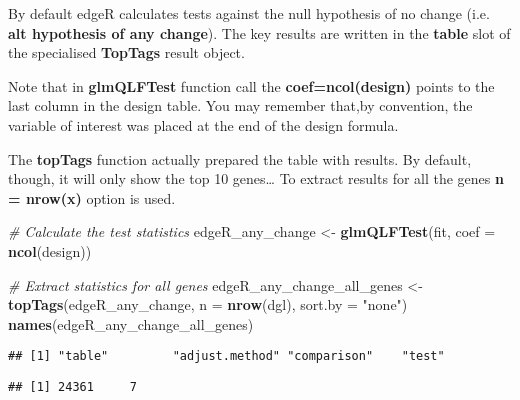 \documentclass[]{book}
\newenvironment{Shaded}{\begin{snugshade}}{\end{snugshade}}
\newcommand{\KeywordTok}[1]{\textcolor[rgb]{0.13,0.29,0.53}{\textbf{#1}}}
\newcommand{\DataTypeTok}[1]{\textcolor[rgb]{0.13,0.29,0.53}{#1}}
\newcommand{\StringTok}[1]{\textcolor[rgb]{0.31,0.60,0.02}{#1}}
\newcommand{\CommentTok}[1]{\textcolor[rgb]{0.56,0.35,0.01}{\textit{#1}}}
\newcommand{\OperatorTok}[1]{\textcolor[rgb]{0.81,0.36,0.00}{\textbf{#1}}}
\newcommand{\NormalTok}[1]{#1}
\begin{document}
By default edgeR calculates tests against the null hypothesis of no
change (i.e. \textbf{alt hypothesis of any change}). The key results are
written in the \textbf{table} slot of the specialised \textbf{TopTags}
result object.

Note that in \textbf{glmQLFTest} function call the
\textbf{coef=ncol(design)} points to the last column in the design
table. You may remember that,by convention, the variable of interest was
placed at the end of the design formula.

The \textbf{topTags} function actually prepared the table with results.
By default, though, it will only show the top 10 genes\ldots{} To
extract results for all the genes \textbf{n = nrow(x)} option is used.

\begin{Shaded}
\begin{Highlighting}[]
\CommentTok{# Calculate the test statistics}
\NormalTok{edgeR_any_change <-}\StringTok{ }\KeywordTok{glmQLFTest}\NormalTok{(fit, }\DataTypeTok{coef =} \KeywordTok{ncol}\NormalTok{(design))}

\CommentTok{# Extract statistics for all genes}
\NormalTok{edgeR_any_change_all_genes <-}\StringTok{ }\KeywordTok{topTags}\NormalTok{(edgeR_any_change, }\DataTypeTok{n =} \KeywordTok{nrow}\NormalTok{(dgl), }\DataTypeTok{sort.by =} \StringTok{"none"}\NormalTok{)}
\KeywordTok{names}\NormalTok{(edgeR_any_change_all_genes)}
\end{Highlighting}
\end{Shaded}

\begin{verbatim}
## [1] "table"         "adjust.method" "comparison"    "test"
\end{verbatim}

\begin{Shaded}
\end{Shaded}

\begin{verbatim}
## [1] 24361     7
\end{verbatim}

\begin{Shaded}
\end{Shaded}
\end{document}
